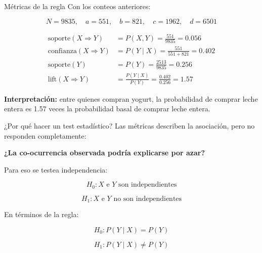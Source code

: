 \documentclass[10pt,aspectratio=169]{beamer}
\begin{document}
\begin{frame}{Métricas de la regla}
Con los conteos anteriores:

\[
N = 9835, \quad a=551, \quad b=821, \quad c=1962, \quad d=6501
\]

\vspace{0.2cm}
\begin{align*}
\text{soporte}(X \Rightarrow Y) &= P(X,Y) = \frac{551}{9835} = 0.056 \\
\text{confianza}(X \Rightarrow Y) &= P(Y\mid X) = \frac{551}{551+821} = 0.402 \\
\text{soporte}(Y) &= P(Y) = \frac{2513}{9835} = 0.256 \\
\text{lift}(X \Rightarrow Y) &= \frac{P(Y\mid X)}{P(Y)} = \frac{0.402}{0.256} = 1.57
\end{align*}

\vspace{0.2cm}
\textbf{Interpretación:} entre quienes compran yogurt, la probabilidad de comprar leche entera es 1.57 veces la probabilidad basal de comprar leche entera.
\end{frame}

\begin{frame}{¿Por qué hacer un test estadístico?}
\Large
Las métricas describen la asociación, pero no responden completamente:

\vspace{0.4cm}
\begin{center}
\textbf{¿La co-ocurrencia observada podría explicarse por azar?}
\end{center}

\vspace{0.4cm}
\normalsize
Para eso se testea independencia:

\[
H_0: X \text{ e } Y \text{ son independientes}
\]

\[
H_1: X \text{ e } Y \text{ no son independientes}
\]

\vspace{0.3cm}
En términos de la regla:

\[
H_0: P(Y\mid X) = P(Y)
\]

\[
H_1: P(Y\mid X) \neq P(Y)
\]
\end{frame}
\end{document}
